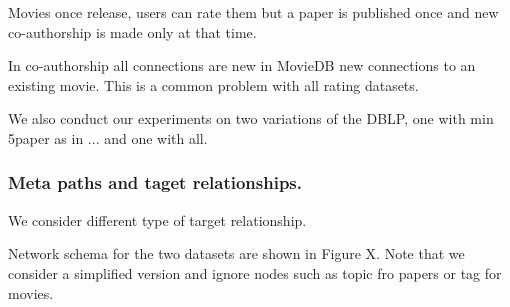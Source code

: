 


Movies once release, users can rate them but a paper is published once and new co-authorship is made only at that time.

In co-authorship all connections are new in MovieDB new connections to an existing movie. This is a common problem with all rating datasets.

We also conduct our experiments on two variations of the DBLP, one with min 5paper as in ... and one with all.


\subsubsection{Meta paths and taget relationships.} We consider different type of target relationship.

Network schema for the two datasets are shown in Figure X. Note that we consider a simplified version and ignore nodes such as topic fro papers or tag for movies.


